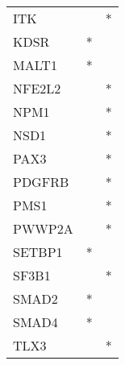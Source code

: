 \begin{tabular}{lcc}
ITK       &                &          * \\
KDSR      &              * &            \\
MALT1     &              * &            \\
NFE2L2    &                &          * \\
NPM1      &                &          * \\
NSD1      &                &          * \\
PAX3      &                &          * \\
PDGFRB    &                &          * \\
PMS1      &                &          * \\
PWWP2A    &                &          * \\
SETBP1    &              * &            \\
SF3B1     &                &          * \\
SMAD2     &              * &            \\
SMAD4     &              * &            \\
TLX3      &                &          * \\
\bottomrule
\end{tabular}
